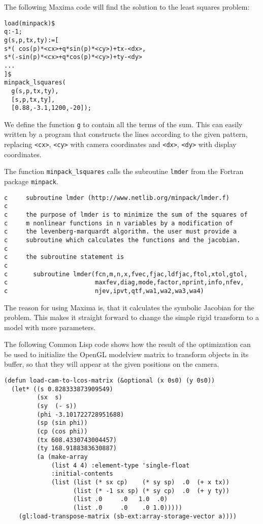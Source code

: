 The following Maxima code will find the solution to the least squares
problem:
\begin{verbatim}
load(minpack)$
q:-1;
g(s,p,tx,ty):=[
s*( cos(p)*<cx>+q*sin(p)*<cy>)+tx-<dx>,
s*(-sin(p)*<cx>+q*cos(p)*<cy>)+ty-<dy>
...
]$
minpack_lsquares(
  g(s,p,tx,ty),
  [s,p,tx,ty],
  [0.88,-3.1,1200,-20]);
\end{verbatim}
We define the function \verb!g! to contain all the terms of the sum.
This can easily written by a program that constructs the lines
according to the given pattern, replacing \verb!<cx>!, \verb!<cy>!
with camera coordinates and \verb!<dx>!, \verb!<dy>! with display
coordinates.

The function \verb!minpack_lsquares! calls the subroutine \verb!lmder!
from the Fortran package \verb!minpack!.

{\small
\begin{verbatim}
c     subroutine lmder (http://www.netlib.org/minpack/lmder.f)
c
c     the purpose of lmder is to minimize the sum of the squares of
c     m nonlinear functions in n variables by a modification of
c     the levenberg-marquardt algorithm. the user must provide a
c     subroutine which calculates the functions and the jacobian.
c
c     the subroutine statement is
c
c       subroutine lmder(fcn,m,n,x,fvec,fjac,ldfjac,ftol,xtol,gtol,
c                        maxfev,diag,mode,factor,nprint,info,nfev,
c                        njev,ipvt,qtf,wa1,wa2,wa3,wa4)
\end{verbatim}
}

The reason for using Maxima is, that it calculates the symbolic
Jacobian for the problem. This makes it straight forward to change the
simple rigid transform to a model with more parameters.

The following Common Lisp code shows how the result of the
optimization can be used to initialize the OpenGL modelview matrix to
transform objects in its buffer, so that they will appear at the given
positions on the camera.

{\small
\begin{verbatim}
(defun load-cam-to-lcos-matrix (&optional (x 0s0) (y 0s0))
  (let* ((s 0.828333873909549)
         (sx  s)
         (sy  (- s))
         (phi -3.101722728951688)
         (sp (sin phi))
         (cp (cos phi))
         (tx 608.4330743004457)
         (ty 168.9188383630887)
         (a (make-array
             (list 4 4) :element-type 'single-float
             :initial-contents
             (list (list (* sx cp)    (* sy sp)  .0  (+ x tx))
                   (list (* -1 sx sp) (* sy cp)  .0  (+ y ty))
                   (list .0     .0   1.0  .0)
                   (list .0     .0    .0 1.0)))))
    (gl:load-transpose-matrix (sb-ext:array-storage-vector a))))    
\end{verbatim}
}
  

